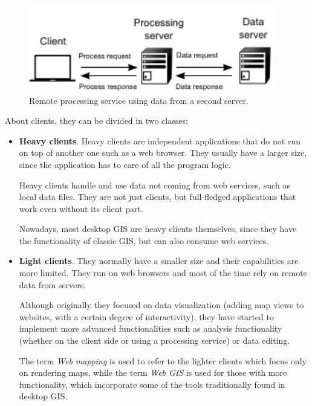 \begin{itemize}
\begin{figure}[!hbt]   
\centering
\includegraphics[width=0.95\textwidth]{Software/Remote_data_and_services.pdf}
\caption{\small Remote processing service using data from a second server.}
\label{Fig:Remote_data_and_services} 
\end{figure}

\end{itemize}

About clients, they can be divided in two classes:

\begin{itemize}

	\item \textbf{Heavy clients}. Heavy clients are independent applications that do not run on top of another one such as a web browser. They usually have a larger size, since the application has to care of all the program logic.

	Heavy clients handle and use data not coming from web services, such as local data files. They are not just clients, but full-fledged applications that work even without its client part.

	Nowadays, most desktop GIS are heavy clients themselves, since they have the functionality of classic GIS, but can also consume web services.


	\item \textbf{Light clients}. They normally have a smaller size and their capabilities are more limited. They run on web browsers and most of the time rely on remote data from servers.

	Although originally they focused on data visualization (adding map views to websites, with a certain degree of interactivity), they have started to implement more advanced functionalities such as analysis functionality (whether on the client side or using a processing service) or data editing.

	The term \emph{Web mapping} is used to refer to the lighter clients which focus only on rendering maps, while the term \emph{Web GIS} is used for those with more functionality, which incorporate some of the tools traditionally found in desktop GIS.
\end{itemize}

